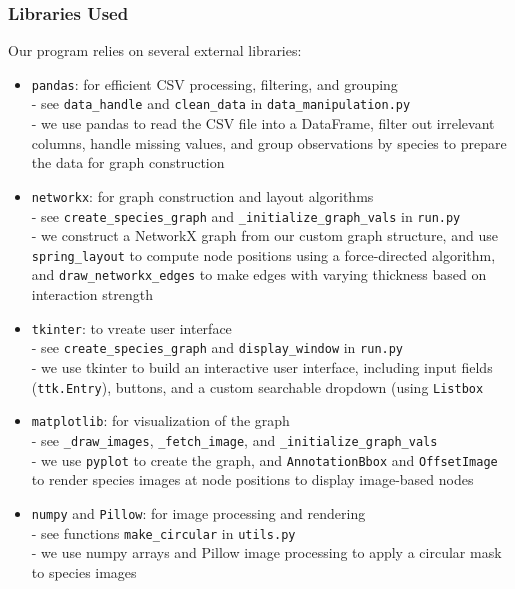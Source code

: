 \documentclass{article}
\begin{document}
\subsubsection{Libraries Used}
Our program relies on several external libraries:
\begin{itemize}
    \item \texttt{pandas}: for efficient CSV processing, filtering, and grouping \\ - see \texttt{data\_handle} and \texttt{clean\_data} in \texttt{data\_manipulation.py} \\
  - we use pandas to read the CSV file into a DataFrame, filter out irrelevant columns, handle missing values, and group observations by species to prepare the data for graph construction
  
    \item \texttt{networkx}: for graph construction and layout algorithms \\ - see \texttt{create\_species\_graph} and \texttt{\_initialize\_graph\_vals} in \texttt{run.py} \\
    - we construct a NetworkX graph from our custom graph structure, and use \texttt{spring\_layout} to compute node positions using a force-directed algorithm, and \texttt{draw\_networkx\_edges} to make edges with varying thickness based on interaction strength
    
    \item \texttt{tkinter}: to vreate user interface
  \\ - see \texttt{create\_species\_graph} and \texttt{display\_window} in \texttt{run.py}
  \\ - we use tkinter to build an interactive user interface, including input fields (\texttt{ttk.Entry}), buttons, and a custom searchable dropdown (using \texttt{Listbox} 

    \item \texttt{matplotlib}: for visualization of the graph
    \\ - see \texttt{\_draw\_images}, \texttt{\_fetch\_image}, and \texttt{\_initialize\_graph\_vals}
    \\ - we use \texttt{pyplot} to create the graph, and \texttt{AnnotationBbox} and \texttt{OffsetImage} to render species images at node positions to display image-based nodes
  
    \item \texttt{numpy} and \texttt{Pillow}: for image processing and rendering \\ - see functions \texttt{make\_circular} in \texttt{utils.py} \\
  - we use numpy arrays and Pillow image processing to apply a circular mask to species images


\end{itemize}
\end{document}
